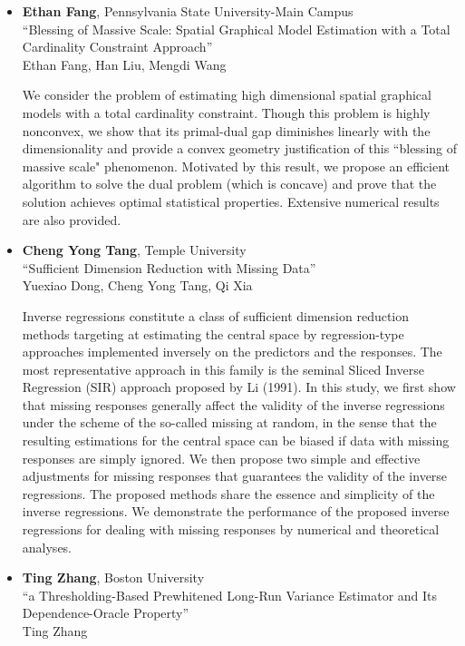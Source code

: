 \begin{itemize}
\item \textbf{Ethan Fang}, Pennsylvania State University-Main Campus \\
``Blessing of Massive Scale: Spatial Graphical Model  Estimation with a Total Cardinality Constraint Approach'' \\
Ethan Fang, Han Liu, Mengdi Wang


We consider the problem of estimating high dimensional spatial graphical models with a total cardinality constraint. Though this problem is highly nonconvex, we show that its primal-dual gap diminishes linearly with the dimensionality and provide a convex geometry justification of this ``blessing of massive scale" phenomenon. Motivated by this result, we propose an efficient algorithm to solve the dual problem (which is concave) and prove that the solution achieves optimal statistical properties. Extensive numerical results are also provided.

\item \textbf{Cheng Yong Tang}, Temple University \\
``Sufficient Dimension Reduction with Missing Data'' \\
Yuexiao Dong, Cheng Yong Tang, Qi Xia


Inverse regressions constitute a class of sufficient dimension reduction methods targeting at estimating the central space by regression-type approaches implemented inversely on the predictors and the responses. The most representative approach in this family is the seminal Sliced Inverse Regression (SIR) approach proposed by Li (1991). In this study, we first show that missing responses generally affect the validity of the inverse regressions under the scheme of the so-called missing at random, in the sense that the resulting estimations for the central space can be biased if data with missing responses are simply ignored.  We then propose two simple and effective adjustments for missing responses that guarantees the validity of the inverse regressions. The proposed methods share the essence and simplicity of the inverse regressions. We demonstrate the performance of the proposed inverse regressions for dealing with missing responses by numerical and theoretical analyses. 

\item \textbf{Ting Zhang}, Boston University \\
``a Thresholding-Based Prewhitened Long-Run Variance Estimator and Its Dependence-Oracle Property'' \\
Ting Zhang



\end{itemize}
